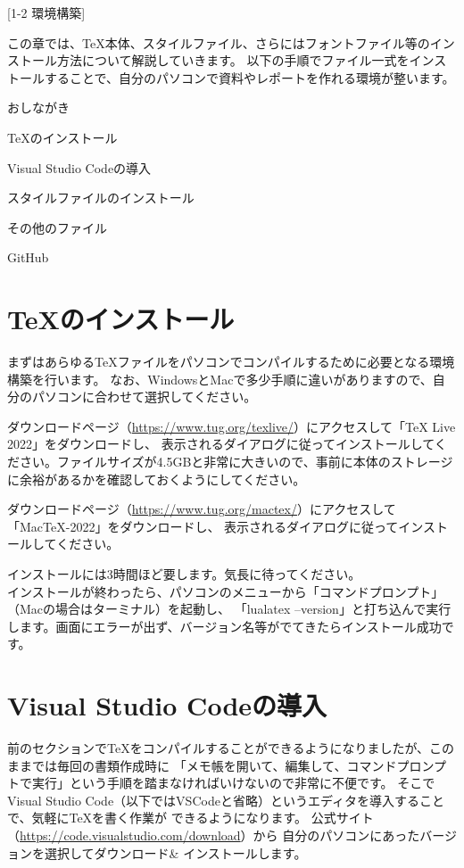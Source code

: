 \newpage
\pagestyle{leaflet}
[1-2 環境構築]
\begin{multicols*}{2}
この章では、\TeX 本体、\BunTeX スタイルファイル、さらにはフォントファイル等のインストール方法について解説していきます。
以下の手順でファイル一式をインストールすることで、自分のパソコンで資料やレポートを作れる環境が整います。
\begin{framebox-simple}{おしながき}
\begin{enumsquarebrackets}
    \item \TeX のインストール\footnotemark[1]
    \item Visual Studio Codeの導入
    \item \BunTeX スタイルファイルのインストール
    \item その他のファイル
    \item GitHub
\end{enumsquarebrackets}
\end{framebox-simple}
\section{\TeX のインストール}
まずはあらゆる\TeX ファイルをパソコンでコンパイルするために必要となる環境構築を行います。
なお、WindowsとMacで多少手順に違いがありますので、自分のパソコンに合わせて選択してください。

ダウンロードページ（\url{https://www.tug.org/texlive/}）にアクセスして「TeX Live 2022」をダウンロードし、
表示されるダイアログに従ってインストールしてください。ファイルサイズが4.5GBと非常に大きいので、事前に本体のストレージに余裕があるかを確認しておくようにしてください。

ダウンロードページ（\url{https://www.tug.org/mactex/}）にアクセスして「MacTeX-2022」をダウンロードし、
表示されるダイアログに従ってインストールしてください。

インストールには3時間ほど要します。気長に待ってください。\\
\indent インストールが終わったら、パソコンのメニューから「コマンドプロンプト」（Macの場合はターミナル）を起動し、
「lualatex --version」と打ち込んで実行します。画面にエラーが出ず、バージョン名等がでてきたらインストール成功です。

\section{Visual Studio Codeの導入}
前のセクションで\TeX をコンパイルすることができるようになりましたが、このままでは毎回の書類作成時に
「メモ帳を開いて、編集して、コマンドプロンプトで実行」という手順を踏まなければいけないので非常に不便です。
そこでVisual Studio Code（以下ではVSCodeと省略）というエディタを導入することで、気軽に\TeX を書く作業が
できるようになります。
公式サイト（\url{https://code.visualstudio.com/download}）から
自分のパソコンにあったバージョンを選択してダウンロード\& インストールします。


\end{multicols*}
